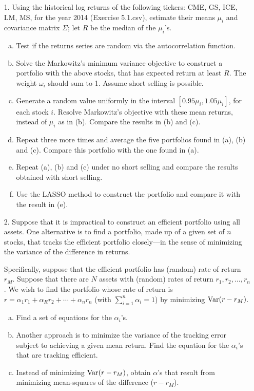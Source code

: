 \begin{enumerate}

\item[1.] Using the historical log returns of the following tickers: CME, GS, ICE, LM, MS, for the year 2014 (Exercise 5.1.csv), estimate their means $\mu_i$ and covariance matrix $\Sigma$; let $R$ be the median of the $\mu_i$'s. 
	\begin{enumerate}[(a)]
	\item Test if the returns series are random via the autocorrelation function.
	\item Solve the Markowitz's minimum variance objective to construct a portfolio with the above stocks, that has expected return at least $R$. The weight $\omega_i$ should sum to 1. Assume short selling is possible.
	\item Generate a random value uniformly in the interval $[0.95\mu_i,1.05\mu_i]$, for each stock $i$. Resolve Markowitz's objective with these mean returns, instead of $\mu_i$ as in (b). Compare the results in (b) and (c).
	\item Repeat three more times and average the five portfolios found in (a), (b) and (c). Compare this portfolio with the one found in (a).
	\item Repeat (a), (b) and (c) under no short selling and compare the results obtained with short selling.
	\item Use the LASSO method to construct the portfolio and compare it with the result in (e).
	\end{enumerate}
	
\item[2.] Suppose that it is impractical to construct an efficient portfolio using all assets. One alternative is to find a portfolio, made up of a given set of $n$ stocks, that tracks the efficient portfolio closely---in the sense of minimizing the variance of the difference in returns.


Specifically, suppose that the efficient portfolio has (random) rate of return $r_M$. Suppose that there are $N$ assets with (random) rates of return $r_1,r_2,\ldots,r_n$. We wish to find the portfolio whose rate of return is $r=\alpha_1 r_1+ \alpha_R r_2+ \cdots+ \alpha_n r_n$ (with $\sum_{i=1}^n \alpha_i=1$) by minimizing $\operatorname{Var}(r - r_M)$.
	\begin{enumerate}[(a)]
	\item Find a set of equations for the $\alpha_i$'s.
	\item Another approach is to minimize the variance of the tracking error subject to achieving a given mean return. Find the equation for the $\alpha_i$'s that are tracking efficient.
	\item Instead of minimizing $\operatorname{Var}(r-r_M)$, obtain $\alpha$'s that result from minimizing mean-squares of the difference ($r-r_M$).
	\end{enumerate}




\end{enumerate}
